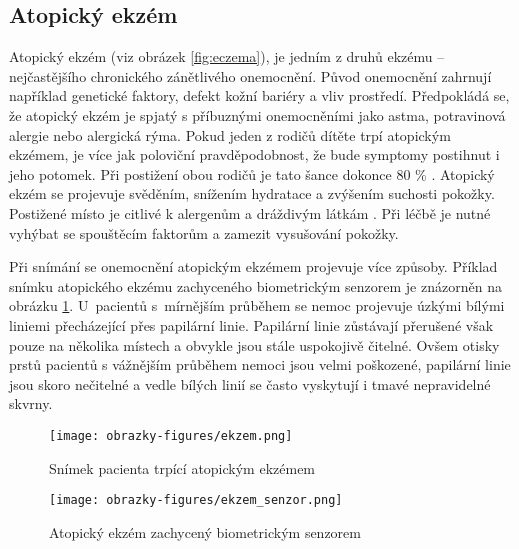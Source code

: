 \subsection{Atopický ekzém}
Atopický ekzém (viz obrázek \ref{fig:eczema}), je jedním z druhů ekzému -- nejčastějšího chronického zánětlivého onemocnění. Původ onemocnění zahrnují například genetické faktory, defekt kožní bariéry a vliv prostředí. Předpokládá se, že atopický ekzém je spjatý s příbuznými onemocněními jako astma, potravinová alergie nebo alergická rýma. Pokud jeden z rodičů dítěte trpí atopickým ekzémem, je více jak poloviční pravděpodobnost, že bude symptomy postihnut i jeho potomek. Při postižení obou rodičů je tato šance dokonce 80 \% \cite{AtopicDermatitis}. Atopický ekzém se projevuje svěděním, snížením hydratace a zvýšením suchosti pokožky. Postižené místo je citlivé k alergenům a dráždivým látkám \cite{AtopicDermatitis}. Při léčbě je nutné vyhýbat se spouštěcím faktorům a zamezit vysušování pokožky.

Při snímání se onemocnění atopickým ekzémem projevuje více způsoby. Příklad snímku atopického ekzému zachyceného biometrickým senzorem je znázorněn na obrázku \ref{fig:eczemasensor}. U~pacientů s~mírnějším průběhem se nemoc projevuje úzkými bílými liniemi přecházející přes papilární linie. Papilární linie zůstávají přerušené však pouze na několika místech a obvykle jsou stále uspokojivě čitelné. Ovšem otisky prstů pacientů s vážnějším průběhem nemoci jsou velmi poškozené, papilární linie jsou skoro nečitelné a vedle bílých linií se často vyskytují i tmavé nepravidelné skvrny.

\begin{figure}[!htbp]
  \begin{minipage}[b]{0.5\linewidth}
    \centering
    \texttt{[image: obrazky-figures/ekzem.png]}
    \caption{Snímek pacienta trpící atopickým ekzémem \cite{Barotova}}
    \label{fig:eczema}
  \end{minipage}
  \hspace{0.5cm}
  \begin{minipage}[b]{0.5\linewidth}
    \centering
    \texttt{[image: obrazky-figures/ekzem\_senzor.png]}
    \caption{Atopický ekzém zachycený biometrickým senzorem \cite{Barotova}}
    \label{fig:eczemasensor}
  \end{minipage}
\end{figure}
